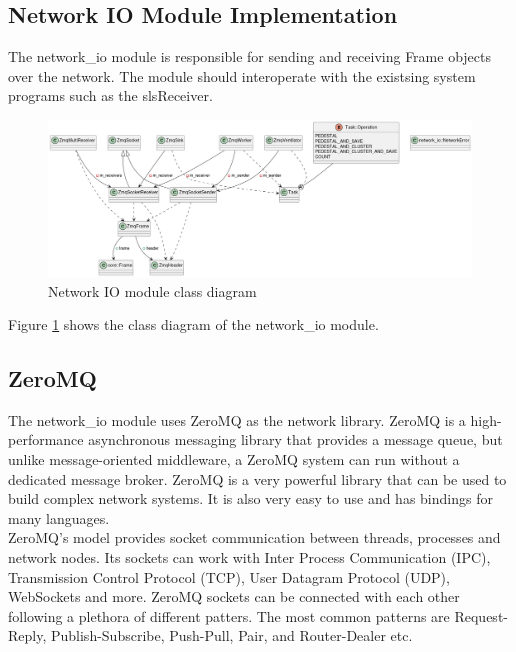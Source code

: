 \begin{spacing}{1.2}
    \section{Network IO Module Implementation}
    The network\_io module is responsible for sending and receiving Frame objects over the network.
    The module should interoperate with the existsing system programs such as the slsReceiver.\\

    \begin{figure}
        \centering
        \includegraphics[width=\textwidth]{Chapitre3/figures/network_io_class.png}
        \caption{Network IO module class diagram}
        \label{fig:network_io_class}
    \end{figure}

    Figure \ref{fig:network_io_class} shows the class diagram of the network\_io module.\\

    \subsection{ZeroMQ}
    The network\_io module uses ZeroMQ as the network library. ZeroMQ is a high-performance
    asynchronous messaging library that provides a message queue, but unlike message-oriented
    middleware, a ZeroMQ system can run without a dedicated message broker. ZeroMQ is a very
    powerful library that can be used to build complex network systems. It is also very easy
    to use and has bindings for many languages. \cite{hintjens2013zeromq} \\

    ZeroMQ's model provides socket communication between threads, processes and network nodes.
    Its sockets can work with Inter Process Communication (IPC), Transmission Control Protocol (TCP),
    User Datagram Protocol (UDP), WebSockets and more. ZeroMQ sockets can be connected with each other
    following a plethora of different patters. The most common patterns are Request-Reply,
    Publish-Subscribe, Push-Pull, Pair, and Router-Dealer etc.\\


\end{spacing}
